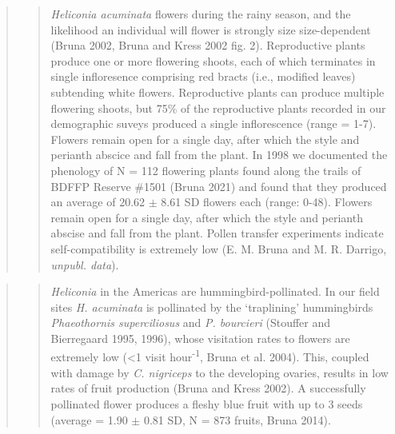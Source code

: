 \documentclass[
  12pt,
  man, donotrepeattitle,floatsintext]{apa6}
\begin{document}
\begin{quote}
\begin{quote}
\emph{Heliconia acuminata} flowers during the rainy season, and the likelihood an individual will flower is strongly size size-dependent (Bruna 2002, Bruna and Kress 2002 fig. 2). Reproductive plants produce one or more flowering shoots, each of which terminates in single infloresence comprising red bracts (i.e., modified leaves) subtending white flowers. Reproductive plants can produce multiple flowering shoots, but 75\% of the reproductive plants recorded in our demographic suveys produced a single inflorescence (range = 1-7). Flowers remain open for a single day, after which the style and perianth abscice and fall from the plant. In 1998 we documented the phenology of N = 112 flowering plants found along the trails of BDFFP Reserve \#1501 (Bruna 2021) and found that they produced an average of 20.62 \(\pm\) 8.61 SD flowers each (range: 0-48). Flowers remain open for a single day, after which the style and perianth abscise and fall from the plant. Pollen transfer experiments indicate self-compatibility is extremely low (E. M. Bruna and M. R. Darrigo, \emph{unpubl. data}).
\end{quote}
\end{quote}

\begin{quote}
\begin{quote}
\emph{Heliconia} in the Americas are hummingbird-pollinated. In our field sites \emph{H. acuminata} is pollinated by the `traplining' hummingbirds \emph{Phaeothornis superciliosus} and \emph{P. bourcieri} (Stouffer and Bierregaard 1995, 1996), whose visitation rates to flowers are extremely low (\textless1 visit hour\textsuperscript{-1}, Bruna et al. 2004). This, coupled with damage by \emph{C. nigriceps} to the developing ovaries, results in low rates of fruit production (Bruna and Kress 2002). A successfully pollinated flower produces a fleshy blue fruit with up to 3 seeds (average = 1.90 \(\pm\) 0.81 SD, N = 873 fruits, Bruna 2014).
\end{quote}
\end{quote}
\end{document}
